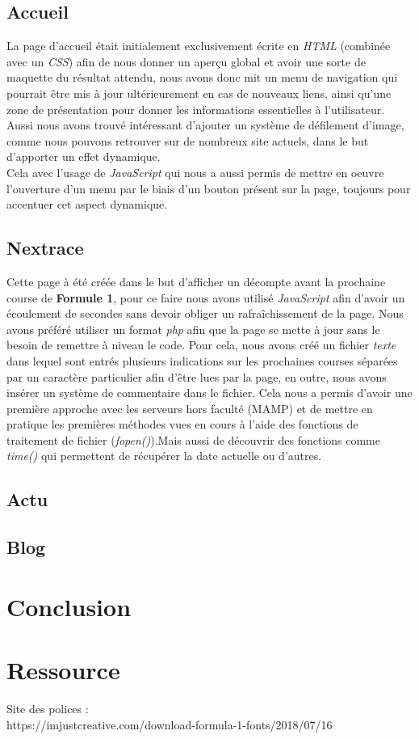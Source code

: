 \documentclass{article}
\begin{document}
\subsection{Accueil}
La page d'accueil était initialement exclusivement écrite en \emph{HTML} (combinée avec un \emph{CSS}) afin de nous donner un aperçu global et avoir une sorte de maquette du résultat attendu, nous avons donc mit un menu de navigation qui pourrait être mis à jour ultérieurement en cas de nouveaux liens, ainsi qu'une zone de présentation pour donner les informations essentielles à l'utilisateur.\\
Aussi nous avons trouvé intéressant d'ajouter un système de défilement d'image, comme nous pouvons retrouver sur de nombreux site actuels, dans le but d'apporter un effet dynamique.\\
Cela avec l'usage de \emph{JavaScript} qui nous a aussi permis de mettre en oeuvre l'ouverture d'un menu par le biais d'un bouton présent sur la page, toujours pour accentuer cet aspect dynamique.

\subsection{Nextrace}
Cette page à été créée dans le but d'afficher un décompte avant la prochaine course de \textbf{Formule 1}, pour ce faire nous avons utilisé \emph{JavaScript} afin d'avoir un écoulement de secondes sans devoir obliger un rafraîchissement de la page.
Nous avons préféré utiliser un format \emph{php} afin que la page se mette à jour sans le besoin de remettre à niveau le code. Pour cela, nous avons créé un fichier \emph{texte} dans lequel sont entrés plusieurs indications sur les prochaines courses séparées par un caractère particulier afin d'être lues par la page, en outre, nous avons insérer un système de commentaire dans le fichier. Cela nous a permis d'avoir une première approche avec les serveurs hors faculté (MAMP) et de mettre en pratique les premières méthodes vues en cours à l'aide des fonctions de traitement de fichier (\emph{fopen()}).Mais aussi de découvrir des fonctions comme \emph{time()} qui permettent de récupérer la date actuelle ou d'autres. 
\subsection{Actu}

\subsection{Blog}

\section{Conclusion}

\section{Ressource}

Site des polices :\\ https://imjustcreative.com/download-formula-1-fonts/2018/07/16
\end{document}
